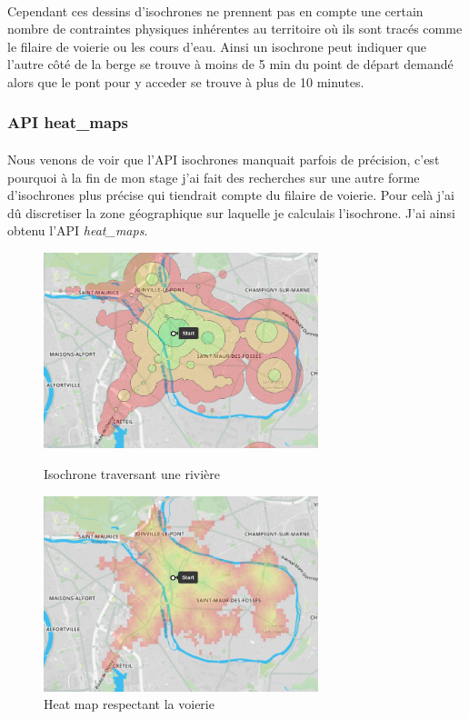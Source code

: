 \documentclass[a4paper]{report}
\begin{document}
\paragraph{} Cependant ces dessins d'isochrones ne prennent pas en compte une certain nombre de contraintes physiques inhérentes au territoire où ils sont tracés comme le filaire de voierie ou les cours d'eau. Ainsi un isochrone peut indiquer que l'autre côté de la berge se trouve à moins de 5 min du point de départ demandé alors que le pont pour y acceder se trouve à plus de 10 minutes.

\subsubsection{API heat\_maps} 

\paragraph{} Nous venons de voir que l'API isochrones manquait parfois de précision, c'est pourquoi à la fin de mon stage j'ai fait des recherches sur une autre forme d'isochrones plus précise qui tiendrait compte du filaire de voierie. Pour celà j'ai dû discretiser la zone géographique sur laquelle je calculais l'isochrone. J'ai ainsi obtenu l'API \emph{heat\_maps}.

\begin{figure}[H]
	\begin{minipage}[c]{.46\linewidth}
		\includegraphics[width=8cm]{image/comp_iso_fin}
       		\caption{Isochrone traversant une rivière}
		\label{Isochrone traversant une rivière}
	\end{minipage} \hfill
	\begin{minipage}[c]{.46\linewidth}
		\includegraphics[width=8cm]{image/comp_raster_fin}
       		\caption{Heat map respectant la voierie}
		\label{Heat map respectant la voierie}
	\end{minipage}
\end{figure}
\end{document}
